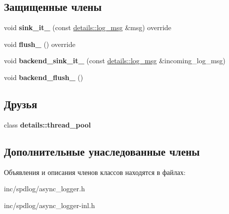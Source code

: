 \subsection*{Защищенные члены}
\begin{DoxyCompactItemize}
\item 
\mbox{\label{classspdlog_1_1async__logger_ac28dab7d752dc73832bb08c408362cec}} 
void {\bfseries sink\+\_\+it\+\_\+} (const \hyperlink{structspdlog_1_1details_1_1log__msg}{details\+::log\+\_\+msg} \&msg) override
\item 
\mbox{\label{classspdlog_1_1async__logger_a945adeb3652f3ffafa4532924a214773}} 
void {\bfseries flush\+\_\+} () override
\item 
\mbox{\label{classspdlog_1_1async__logger_ae7342ebd2fab33de3da401966b05a874}} 
void {\bfseries backend\+\_\+sink\+\_\+it\+\_\+} (const \hyperlink{structspdlog_1_1details_1_1log__msg}{details\+::log\+\_\+msg} \&incoming\+\_\+log\+\_\+msg)
\item 
\mbox{\label{classspdlog_1_1async__logger_aa99925726af79079783693c51542e413}} 
void {\bfseries backend\+\_\+flush\+\_\+} ()
\end{DoxyCompactItemize}
\subsection*{Друзья}
\begin{DoxyCompactItemize}
\item 
\mbox{\label{classspdlog_1_1async__logger_a67ce2a7de422d11203d66f1f6da4be03}} 
class {\bfseries details\+::thread\+\_\+pool}
\end{DoxyCompactItemize}
\subsection*{Дополнительные унаследованные члены}


Объявления и описания членов классов находятся в файлах\+:\begin{DoxyCompactItemize}
\item 
inc/spdlog/async\+\_\+logger.\+h\item 
inc/spdlog/async\+\_\+logger-\/inl.\+h\end{DoxyCompactItemize}
